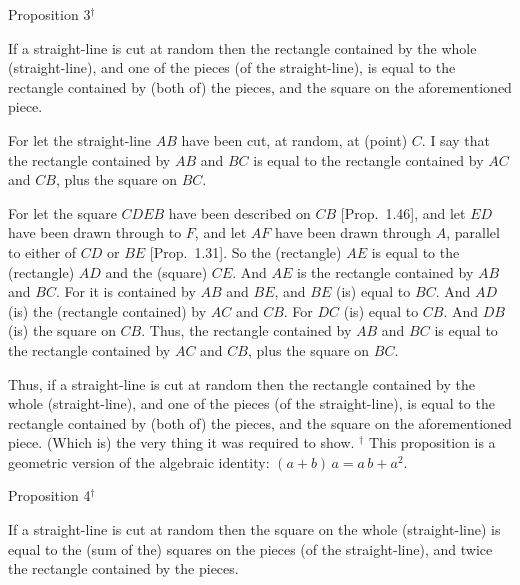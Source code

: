 \begin{center}
{\large Proposition 3$^\dag$}
\end{center}

If  a straight-line is cut at random then the rectangle contained by the
whole (straight-line), and one of the pieces (of the straight-line),
is equal to the rectangle contained by (both of) the pieces, and the square on
the aforementioned piece.

\centerline{}

For let the straight-line $AB$ have been cut, at random, at (point) $C$.
I say that the rectangle contained by $AB$ and $BC$ is equal to the
rectangle contained by $AC$ and $CB$, plus the square on $BC$.

For let the square $CDEB$ have been described on $CB$ [Prop.~1.46],
and let $ED$ have been drawn through to $F$, and let $AF$ have been
drawn through $A$, parallel to either of $CD$ or $BE$ [Prop.~1.31].
So the (rectangle) $AE$ is equal to the (rectangle) $AD$ and the (square) $CE$.
And $AE$ is the rectangle contained by $AB$ and $BC$.
For it is contained by $AB$ and $BE$, and $BE$ (is) equal to $BC$. And
$AD$ (is) the (rectangle contained) by $AC$ and $CB$. For $DC$
(is) equal to $CB$. And $DB$ (is) the square on $CB$. Thus, the rectangle
contained by $AB$ and $BC$ is equal to the rectangle contained by $AC$ and
$CB$, plus the square on $BC$.

Thus, if a straight-line is cut at random then the rectangle contained by the
whole (straight-line),  and one of the pieces (of the straight-line),
is equal to the rectangle contained by (both of) the pieces, and the square on
the aforementioned piece. (Which is) the very thing it was required
to show.
{\footnotesize \noindent$^\dag$ This proposition is a geometric version
of the algebraic identity: $(a+b)\,a = a\,b + a^2$.}


\begin{center}
{\large Proposition 4$^\dag$}
\end{center}

If a straight-line is cut at random then the square on the whole (straight-line)
is equal to the (sum of the) squares on the pieces (of the straight-line),  and twice the
rectangle contained by the pieces.

\epsfysize=2.2in
\centerline{}

